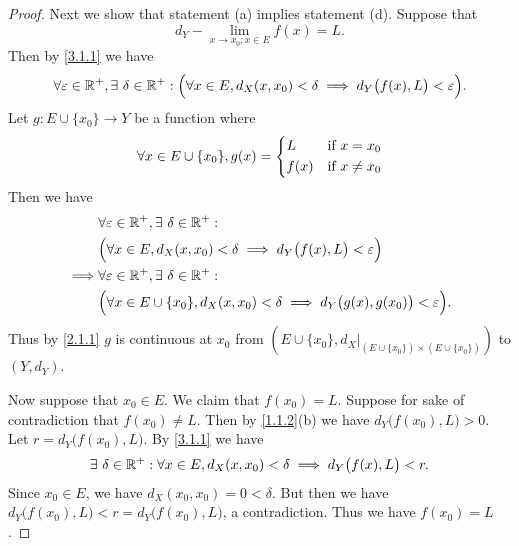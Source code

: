 \begin{proof}
  Next we show that statement (a) implies statement (d).
  Suppose that
  \[
    d_Y - \lim_{x \to x_0 ; x \in E} f(x) = L.
  \]
  Then by \cref{3.1.1} we have
  \[
    \forall \varepsilon \in \mathbb{R}^+, \exists\ \delta \in \mathbb{R}^+ : \Big(\forall x \in E, d_X(x, x_0) < \delta \implies d_Y\big(f(x), L\big) < \varepsilon\Big).
  \]
  Let \(g : E \cup \{x_0\} \to Y\) be a function where
  \[
    \forall x \in E \cup \{x_0\}, g(x) = \begin{dcases}
      L    & \text{if } x = x_0    \\
      f(x) & \text{if } x \neq x_0
    \end{dcases}
  \]
  Then we have
  \begin{align*}
             & \forall \varepsilon \in \mathbb{R}^+, \exists\ \delta \in \mathbb{R}^+ :                                                       \\
             & \Big(\forall x \in E, d_X(x, x_0) < \delta \implies d_Y\big(f(x), L\big) < \varepsilon\Big)                    \\
    \implies & \forall \varepsilon \in \mathbb{R}^+, \exists\ \delta \in \mathbb{R}^+ :                                                       \\
             & \Big(\forall x \in E \cup \{x_0\}, d_X(x, x_0) < \delta \implies d_Y\big(g(x), g(x_0)\big) < \varepsilon\Big).
  \end{align*}
  Thus by \cref{2.1.1} \(g\) is continuous at \(x_0\) from \((E \cup \{x_0\}, d_X|_{(E \cup \{x_0\}) \times (E \cup \{x_0\})})\) to \((Y, d_Y)\).

  Now suppose that \(x_0 \in E\).
  We claim that \(f(x_0) = L\).
  Suppose for sake of contradiction that \(f(x_0) \neq L\).
  Then by \cref{1.1.2}(b) we have \(d_Y\big(f(x_0), L\big) > 0\).
  Let \(r = d_Y\big(f(x_0), L\big)\).
  By \cref{3.1.1} we have
  \[
    \exists\ \delta \in \mathbb{R}^+ : \forall x \in E, d_X(x, x_0) < \delta \implies d_Y\big(f(x), L\big) < r.
  \]
  Since \(x_0 \in E\), we have \(d_X(x_0, x_0) = 0 < \delta\).
  But then we have \(d_Y\big(f(x_0), L\big) < r = d_Y\big(f(x_0), L\big)\), a contradiction.
  Thus we have \(f(x_0) = L\).


\end{proof}
